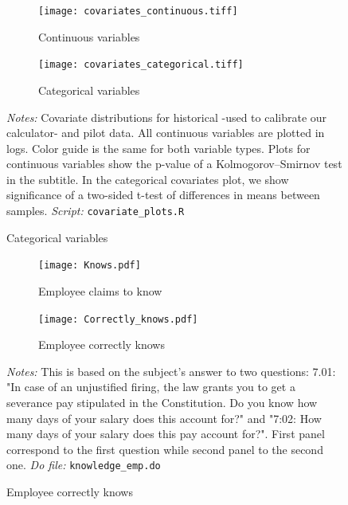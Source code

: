 \documentclass[11pt]{article}
\begin{document}
\begin{figure}[H]
\caption{Covariate distribution in Historical and Pilot data}
\label{covariate_distribution}
    \begin{center}
        \begin{subfigure}{0.49\textwidth}
            \caption{Continuous variables}
            \centering
            \texttt{[image: covariates\_continuous.tiff]}
        \end{subfigure}
        \begin{subfigure}{0.49\textwidth}
            \caption{Categorical variables}
            \centering
            \texttt{[image: covariates\_categorical.tiff]}
        \end{subfigure}
    \end{center}
    {\footnotesize \textit{Notes: } Covariate distributions for historical -used to calibrate our calculator- and pilot data. All continuous variables are plotted in logs. Color guide is the same for both variable types. Plots for continuous variables show the p-value of a Kolmogorov–Smirnov test in the subtitle. In the categorical covariates plot, we show significance of a two-sided t-test of differences in means between samples.}
    {\footnotesize \textit{Script: } \texttt{covariate\_plots.R}}
\end{figure}

\begin{figure}[H]
    \caption{Percent that know main legal constitutional entitlement}
    \label{Knowindemfig}
    \begin{center}
        \begin{subfigure}{0.49\textwidth}
            \caption{Employee claims to know}
            \centering
            \texttt{[image: Knows.pdf]}
        \end{subfigure}
        \begin{subfigure}{0.49\textwidth}
            \caption{Employee correctly knows }
                \centering
                \texttt{[image: Correctly\_knows.pdf]}
        \end{subfigure}
        \end{center}
    {\footnotesize \textit{Notes: } This is based on the subject's answer to two questions: 7.01: "In case of an unjustified firing, the law grants you to get a severance pay stipulated in the Constitution. Do you know how many days of your salary does this account for?" and "7:02: How many days of your salary does this pay account for?". First panel correspond to the first question while second panel to the second one.}
    {\footnotesize \textit{Do file: } \texttt{knowledge\_emp.do}}
\end{figure}
\end{document}
